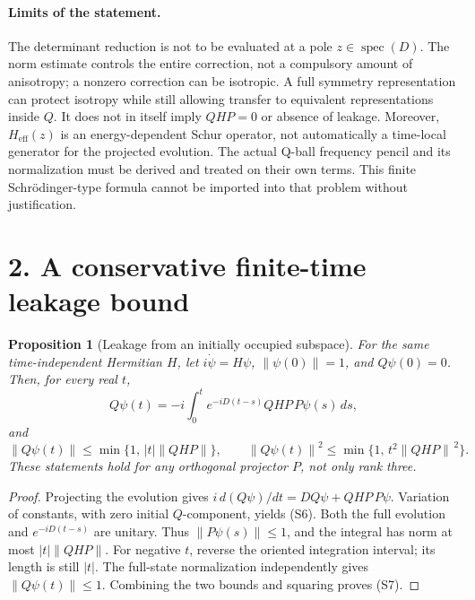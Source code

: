 \documentclass[a4paper,11pt]{article}
\newtheorem{proposition}{Proposition}
\newcommand{\norm}[1]{\left\lVert #1\right\rVert}
\newcommand{\spec}{\operatorname{spec}}
\begin{document}
\paragraph{Limits of the statement.}
The determinant reduction is not to be evaluated at a pole \(z\in\spec(D)\).
The norm estimate controls the entire correction, not a compulsory amount
of anisotropy; a nonzero correction can be isotropic. A full symmetry
representation can protect isotropy while still allowing transfer to
equivalent representations inside \(Q\). It does not in itself imply
\(QHP=0\) or absence of leakage.
Moreover, \(H_{\mathrm{eff}}(z)\) is an energy-dependent Schur operator,
not automatically a time-local generator for the projected evolution.
The actual Q-ball frequency pencil and its normalization must be derived
and treated on their own terms. This finite Schr\"odinger-type formula
cannot be imported into that problem without justification.

\section*{2. A conservative finite-time leakage bound}
\begin{proposition}[Leakage from an initially occupied subspace]
For the same time-independent Hermitian \(H\), let
\(i\dot\psi=H\psi\), \(\norm{\psi(0)}=1\), and \(Q\psi(0)=0\).
Then, for every real \(t\),
\begin{equation}
Q\psi(t)=-i\int_0^t
 e^{-iD(t-s)}QHP\,P\psi(s)\,ds,
\tag{S6}
\end{equation}
and
\begin{equation}
\norm{Q\psi(t)}\leq
\min\{1,\,|t|\norm{QHP}\},\qquad
\norm{Q\psi(t)}^2\leq
\min\{1,\,t^2\norm{QHP}^{\,2}\}.
\tag{S7}
\end{equation}
These statements hold for any orthogonal projector \(P\), not only rank three.
\end{proposition}

\begin{proof}
Projecting the evolution gives
\(i\,d(Q\psi)/dt=DQ\psi+QHP\,P\psi\).
Variation of constants, with zero initial \(Q\)-component, yields (S6).
Both the full evolution and \(e^{-iD(t-s)}\) are unitary.
Thus \(\norm{P\psi(s)}\leq1\), and the integral has norm at most
\(|t|\norm{QHP}\). For negative \(t\), reverse the oriented integration
interval; its length is still \(|t|\).
The full-state normalization independently gives
\(\norm{Q\psi(t)}\leq1\). Combining the two bounds and squaring proves (S7).
\end{proof}
\end{document}
